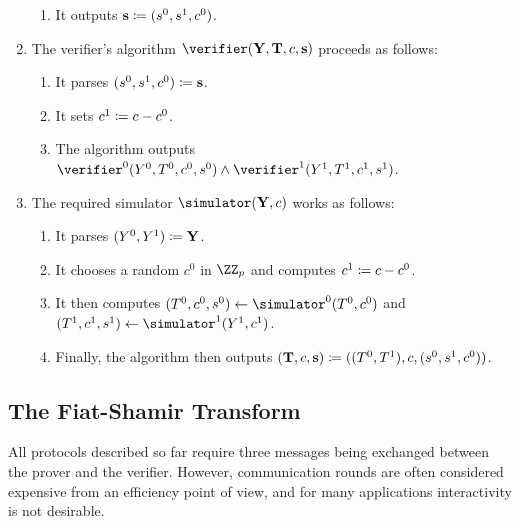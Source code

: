 \documentclass[runningheads,11pt]{article}
\begin{document}
\begin{enumerate}
\begin{enumerate}
      \item
        It outputs $\mathbf {s}\coloneqq(s^0,s^1, c^0)$.
    \end{enumerate}
  \item
    The verifier's algorithm $\verifier(\vec \statement, \vec \commitment,\challenge,\vec \response)$ proceeds as follows:
    \begin{enumerate}
      \item
        It  parses $(s^0, s^1, c^0)\coloneqq \mathbf {s}$.
      \item
        It sets $c^1\coloneqq c-c^0$.
      \item
	The algorithm outputs $\verifier^0(\statement^0, \commitment^0,c^0,s^0)\land\verifier^1(\statement^1, \commitment^1,c^1,s^1)$.
    \end{enumerate}
  \item
    The required simulator $\simulator(\vec Y,c)$ works as follows:
    \begin{enumerate}
      \item
        It parses $(Y^0,Y^1)\coloneqq \mathbf {Y}$.
      \item
        It chooses a random $c^0$ in $\ZZ_p$ and computes $c^1\coloneqq c-c^0$.
      \item
        It then computes $(\commitment^0,\challenge^0, \response^0)\gets\simulator^0(\commitment^0,\challenge^0)$ and $(\commitment^1,\challenge^1,\response^1)\gets\simulator^1(\statement^1,\challenge^1)$.
      \item
        Finally, the algorithm then outputs $(\mathbf {T},c,\mathbf s)\coloneqq ((T^0,T^1),c,(s^0,s^1,c^0))$.
    \end{enumerate}
\end{enumerate}

\subsection{The Fiat-Shamir Transform}\label{sec:fs}
All protocols described so far require three messages being exchanged between the prover and the verifier.
However, communication rounds are often considered expensive from an efficiency point of view, and for many applications interactivity is not desirable.
\end{document}
